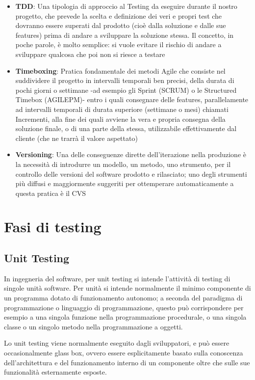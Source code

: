 \documentclass[11pt,a4paper]{book}
\begin{document}
\begin{itemize}
	\item \textbf{TDD}: Una tipologia di approccio al Testing da eseguire durante il nostro progetto, che prevede la scelta e definizione dei veri e propri test che dovranno essere superati dal prodotto (cioè dalla soluzione e dalle sue features) prima di andare a sviluppare la soluzione stessa. Il concetto, in poche parole, è molto semplice: si vuole evitare il rischio di andare a sviluppare qualcosa che poi non si riesce a testare
	\item \textbf{Timeboxing}: Pratica fondamentale dei metodi Agile che consiste nel suddividere il progetto in intervalli temporali ben precisi, della durata di pochi giorni o settimane -ad esempio gli Sprint (SCRUM) o le Structured Timebox (AGILEPM)- entro i quali consegnare delle features, parallelamente ad intervalli temporali di durata superiore (settimane o mesi) chiamati Incrementi, alla fine dei quali avviene la vera e propria consegna della soluzione finale, o di una parte della stessa, utilizzabile effettivamente dal cliente (che ne trarrà il valore aspettato)
	\item \textbf{Versioning}: Una delle conseguenze dirette dell'iterazione nella produzione è la necessità di introdurre un modello, un metodo, uno strumento, per il controllo delle versioni del software prodotto e rilasciato; uno degli strumenti più diffusi e maggiormente suggeriti per ottemperare automaticamente a questa pratica è il CVS
\end{itemize}


\chapter{Fasi di testing}
\section{Unit Testing}\label{par: unit test}
In ingegneria del software, per unit testing si intende l'attività di testing di singole unità software. Per unità si intende normalmente il minimo componente di un programma dotato di funzionamento autonomo; a seconda del paradigma di programmazione o linguaggio di programmazione, questo può corrispondere per esempio a una singola funzione nella programmazione procedurale, o una singola classe o un singolo metodo nella programmazione a oggetti.

Lo unit testing viene normalmente eseguito dagli sviluppatori, e può essere occasionalmente glass box, ovvero essere esplicitamente basato sulla conoscenza dell'architettura e del funzionamento interno di un componente oltre che sulle sue funzionalità esternamente esposte.
\end{document}
